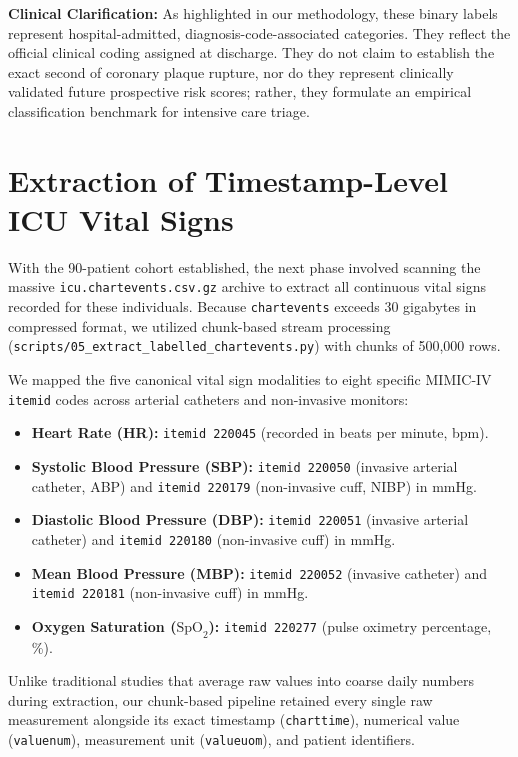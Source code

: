 \textbf{Clinical Clarification:} As highlighted in our methodology, these binary labels represent hospital-admitted, diagnosis-code-associated categories. They reflect the official clinical coding assigned at discharge. They do not claim to establish the exact second of coronary plaque rupture, nor do they represent clinically validated future prospective risk scores; rather, they formulate an empirical classification benchmark for intensive care triage.

\section{Extraction of Timestamp-Level ICU Vital Signs}
\label{sec:vital_sign_extraction}

With the 90-patient cohort established, the next phase involved scanning the massive \texttt{icu.chartevents.csv.gz} archive to extract all continuous vital signs recorded for these individuals. Because \texttt{chartevents} exceeds 30 gigabytes in compressed format, we utilized chunk-based stream processing (\texttt{scripts/05\_extract\_labelled\_chartevents.py}) with chunks of 500,000 rows.

We mapped the five canonical vital sign modalities to eight specific MIMIC-IV \texttt{itemid} codes across arterial catheters and non-invasive monitors:
\begin{itemize}
    \item \textbf{Heart Rate (HR):} \texttt{itemid 220045} (recorded in beats per minute, bpm).
    \item \textbf{Systolic Blood Pressure (SBP):} \texttt{itemid 220050} (invasive arterial catheter, ABP) and \texttt{itemid 220179} (non-invasive cuff, NIBP) in mmHg.
    \item \textbf{Diastolic Blood Pressure (DBP):} \texttt{itemid 220051} (invasive arterial catheter) and \texttt{itemid 220180} (non-invasive cuff) in mmHg.
    \item \textbf{Mean Blood Pressure (MBP):} \texttt{itemid 220052} (invasive catheter) and \texttt{itemid 220181} (non-invasive cuff) in mmHg.
    \item \textbf{Oxygen Saturation ($\text{SpO}_2$):} \texttt{itemid 220277} (pulse oximetry percentage, \%).
\end{itemize}

Unlike traditional studies that average raw values into coarse daily numbers during extraction, our chunk-based pipeline retained every single raw measurement alongside its exact timestamp (\texttt{charttime}), numerical value (\texttt{valuenum}), measurement unit (\texttt{valueuom}), and patient identifiers.

